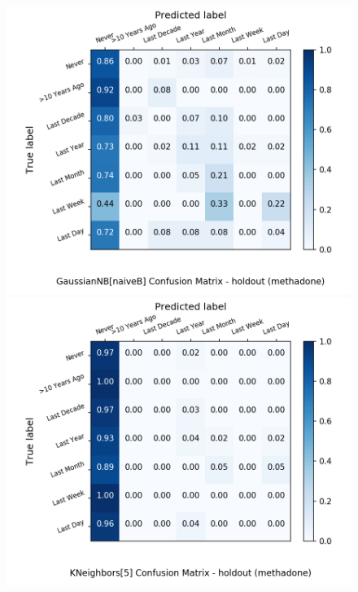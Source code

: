 \begin{figure}[H]
\begin{minipage}[b]{0.32\textwidth}
		\includegraphics[width=1.1\textwidth]{Plots/methadone_GaussianNB_naiveB_balance_False_holdout.png}
	\end{minipage}
	\begin{minipage}[b]{0.32\textwidth}
		\includegraphics[width=1.1\textwidth]{Plots/methadone_KNeighbors_5_balance_False_holdout.png}
  \end{minipage}
	\begin{minipage}[b]{0.32\textwidth}

\end{minipage}
\end{figure}
